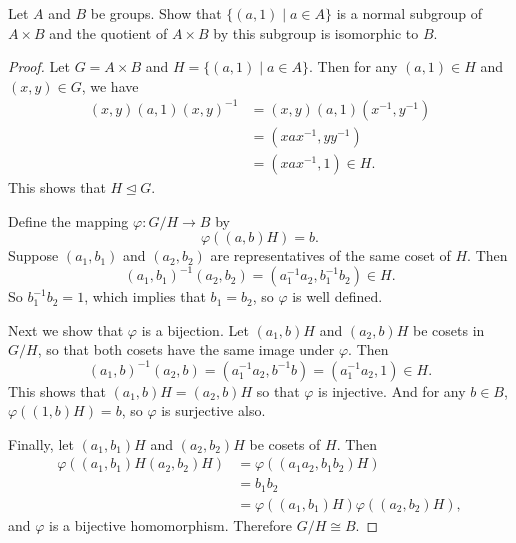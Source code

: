  Let $A$ and $B$ be groups. Show that
$\{(a,1)\mid a\in A\}$ is a normal subgroup of $A\times B$ and the
quotient of $A\times B$ by this subgroup is isomorphic to $B$.
\begin{proof}
  Let $G = A\times B$ and $H = \{(a,1)\mid a\in A\}$. Then for any
  $(a,1)\in H$ and $(x,y)\in G$, we have
  \begin{align*}
    (x,y)(a,1)(x,y)^{-1}
    &= (x,y)(a,1)(x^{-1},y^{-1}) \\
    &= (xax^{-1}, yy^{-1}) \\
    &= (xax^{-1},1)\in H.
  \end{align*}
  This shows that $H\trianglelefteq G$.

  Define the mapping $\varphi\colon G/H\to B$ by
  \begin{equation*}
    \varphi((a,b)H) = b.
  \end{equation*}
  Suppose $(a_1,b_1)$ and $(a_2,b_2)$ are representatives of the same
  coset of $H$. Then
  \begin{equation*}
    (a_1,b_1)^{-1}(a_2,b_2) = (a_1^{-1}a_2,b_1^{-1}b_2) \in H.
  \end{equation*}
  So $b_1^{-1}b_2 = 1$, which implies that $b_1 = b_2$, so $\varphi$
  is well defined.

  Next we show that $\varphi$ is a bijection. Let $(a_1,b)H$ and
  $(a_2,b)H$ be cosets in $G/H$, so that both cosets have the same
  image under $\varphi$. Then
  \begin{equation*}
    (a_1,b)^{-1}(a_2,b) = (a_1^{-1}a_2,b^{-1}b) = (a_1^{-1}a_2,1)\in H.
  \end{equation*}
  This shows that $(a_1,b)H = (a_2,b)H$ so that $\varphi$ is
  injective. And for any $b\in B$, $\varphi((1,b)H) = b$, so $\varphi$
  is surjective also.

  Finally, let $(a_1,b_1)H$ and $(a_2,b_2)H$ be cosets of $H$. Then
  \begin{align*}
    \varphi((a_1,b_1)H(a_2,b_2)H)
    &= \varphi((a_1a_2,b_1b_2)H) \\
    &= b_1b_2 \\
    &= \varphi((a_1,b_1)H)\varphi((a_2,b_2)H),
  \end{align*}
  and $\varphi$ is a bijective homomorphism. Therefore $G/H\cong B$.
\end{proof}

